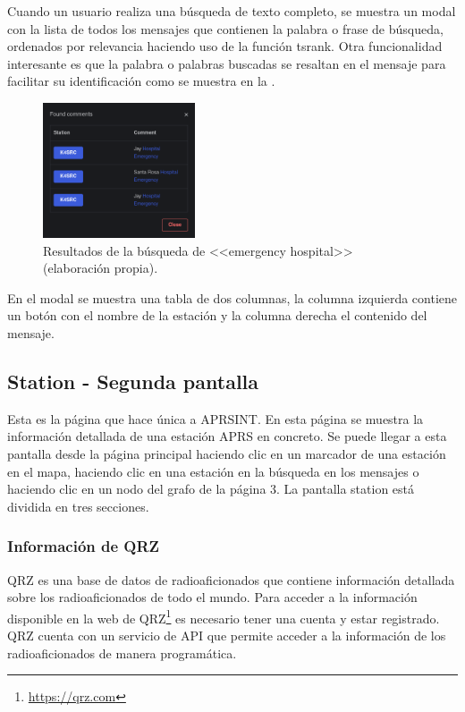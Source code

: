 Cuando un usuario realiza una búsqueda de texto completo, se muestra un modal con la lista de todos los mensajes que contienen la palabra o frase de búsqueda, ordenados por relevancia haciendo uso de la función ts\textunderscore rank. Otra funcionalidad interesante es que la palabra o palabras buscadas se resaltan en el mensaje para facilitar su identificación como se muestra en la .

\begin{figure}[h]
	\centering
	\includegraphics[width=0.4\textwidth]{Imagenes/Chapter_4/fts_output.png}
	\caption[Resultados de la búsqueda de <<emergency hospital>>.]{Resultados de la búsqueda de <<emergency hospital>> (elaboración propia).}
	\label{fig:postgres-fts}
\end{figure}
\FloatBarrier

\noindent En el modal se muestra una tabla de dos columnas, la columna izquierda contiene un botón con el nombre de la estación y la columna derecha el contenido del mensaje.

\subsection{Station - Segunda pantalla}
Esta es la página que hace única a APRSINT. En esta página se muestra la información detallada de una estación APRS en concreto. Se puede llegar a esta pantalla desde la página principal haciendo clic en un marcador de una estación en el mapa, haciendo clic en una estación en la búsqueda en los mensajes o haciendo clic en un nodo del grafo de la página 3. La pantalla station está dividida en tres secciones.

\subsubsection*{Información de QRZ}
QRZ es una base de datos de radioaficionados que contiene información detallada sobre los radioaficionados de todo el mundo. Para acceder a la información disponible en la web de QRZ\footnote{\url{https://qrz.com}} es necesario tener una cuenta y estar registrado. QRZ cuenta con un servicio de API que permite acceder a la información de los radioaficionados de manera programática.

